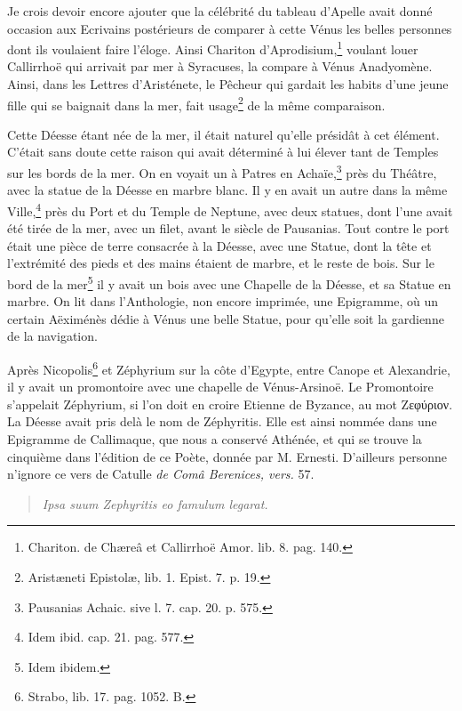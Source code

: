 \documentclass[a4paper, 18pt, oneside]{article}
\begin{document}
Je crois devoir encore ajouter que la célébrité du tableau d'Apelle avait donné occasion aux Ecrivains postérieurs de comparer à cette Vénus les belles personnes dont ils voulaient faire l'éloge. Ainsi Chariton d'Aprodisium,\footnote{Chariton. de Chæreâ et Callirrhoë Amor. lib. 8. pag. 140.} voulant louer Callirrhoë qui arrivait par mer à Syracuses, la compare à Vénus Anadyomène. Ainsi, dans les Lettres d'Aristénete, le Pêcheur qui gardait les habits d'une jeune fille qui se baignait dans la mer, fait usage\footnote{Aristæneti Epistolæ, lib. 1. Epist. 7. p. 19.} de la même comparaison.

Cette Déesse étant née de la mer, il était naturel qu'elle présidât à cet élément. C'était sans doute cette raison qui avait déterminé à lui élever tant de Temples sur les bords de la mer. On en voyait un à Patres en Achaïe,\footnote{Pausanias Achaic. sive l. 7. cap. 20. p. 575.} près du Théâtre, avec la statue de la Déesse en marbre blanc. Il y en avait un autre dans la même Ville,\footnote{Idem ibid. cap. 21. pag. 577.} près du Port et du Temple de Neptune, avec deux statues, dont l'une avait été tirée de la mer, avec un filet, avant le siècle de Pausanias. Tout contre le port était une pièce de terre consacrée à la Déesse, avec une Statue, dont la tête et l'extrémité des pieds et des mains étaient de marbre, et le reste de bois. Sur le bord de la mer\footnote{Idem ibidem.} il y avait un bois avec une Chapelle de la Déesse, et sa Statue en marbre. On lit dans l'Anthologie, non encore imprimée, une Epigramme, où un certain Aëximénès dédie à Vénus une belle Statue, pour qu'elle soit la gardienne de la navigation.

Après Nicopolis\footnote{Strabo, lib. 17. pag. 1052. B.} et Zéphyrium sur la côte d'Egypte, entre Canope et Alexandrie, il y avait un promontoire avec une chapelle de Vénus-Arsinoë. Le Promontoire s'appelait Zéphyrium, si l'on doit en croire Etienne de Byzance, au mot Ζεφύριον. La Déesse avait pris delà le nom de Zéphyritis. Elle est ainsi nommée dans une Epigramme de Callimaque, que nous a conservé Athénée, et qui se trouve la cinquième dans l'édition de ce Poète, donnée par M. Ernesti. D'ailleurs personne n'ignore ce vers de Catulle \emph{de Comâ Berenices, vers.} 57.
\begin{quotation}
\emph{Ipsa suum Zephyritis eo famulum legarat.}
\end{quotation}
\end{document}

